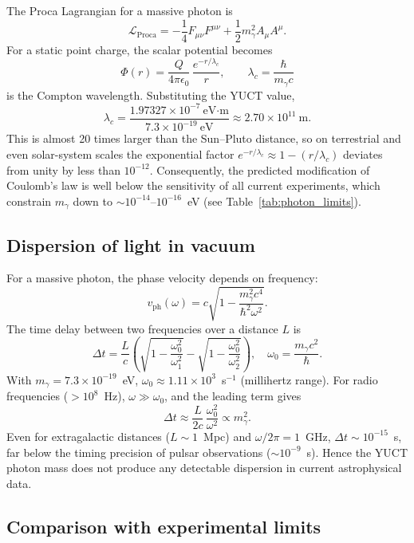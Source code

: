 \documentclass[12pt,a4paper]{article}
\begin{document}
	The Proca Lagrangian for a massive photon is
	\[
	\mathcal{L}_{\text{Proca}} = -\frac14 F_{\mu\nu}F^{\mu\nu} + \frac12 m_\gamma^2 A_\mu A^\mu .
	\]
	For a static point charge, the scalar potential becomes
	\[
	\Phi(r) = \frac{Q}{4\pi\epsilon_0}\,\frac{e^{-r/\lambda_c}}{r},
	\qquad
	\lambda_c = \frac{\hbar}{m_\gamma c}
	\]
	is the Compton wavelength. Substituting the YUCT value,
	\[
	\lambda_c = \frac{1.97327\times10^{-7}~\text{eV·m}}{7.3\times10^{-19}~\text{eV}}
	\approx 2.70\times10^{11}~\text{m}.
	\]
	This is almost 20 times larger than the Sun–Pluto distance, so on terrestrial and even solar-system scales the exponential factor \(e^{-r/\lambda_c}\approx 1 - (r/\lambda_c)\) deviates from unity by less than \(10^{-12}\). Consequently, the predicted modification of Coulomb’s law is well below the sensitivity of all current experiments, which constrain \(m_\gamma\) down to \(\sim 10^{-14}\)–\(10^{-16}\)~eV (see Table~\ref{tab:photon_limits}).
	
	\subsection{Dispersion of light in vacuum}
	
	For a massive photon, the phase velocity depends on frequency:
	\[
	v_{\text{ph}}(\omega) = c\sqrt{1 - \frac{m_\gamma^2 c^4}{\hbar^2\omega^2}} .
	\]
	The time delay between two frequencies over a distance \(L\) is
	\[
	\Delta t = \frac{L}{c}\left( \sqrt{1-\frac{\omega_0^2}{\omega_1^2}} - \sqrt{1-\frac{\omega_0^2}{\omega_2^2}} \right),
	\quad \omega_0 = \frac{m_\gamma c^2}{\hbar}.
	\]
	With \(m_\gamma = 7.3\times10^{-19}\)~eV, \(\omega_0 \approx 1.11\times10^{3}\)~s\(^{-1}\) (millihertz range). For radio frequencies (\(>10^8\)~Hz), \(\omega \gg \omega_0\), and the leading term gives
	\[
	\Delta t \approx \frac{L}{2c}\,\frac{\omega_0^2}{\omega^2} \propto m_\gamma^2.
	\]
	Even for extragalactic distances (\(L\sim 1\)~Mpc) and \(\omega/2\pi = 1\)~GHz, \(\Delta t \sim 10^{-15}\)~s, far below the timing precision of pulsar observations (\(\sim 10^{-9}\)~s). Hence the YUCT photon mass does not produce any detectable dispersion in current astrophysical data.
	
	\subsection{Comparison with experimental limits}
	
\end{document}

